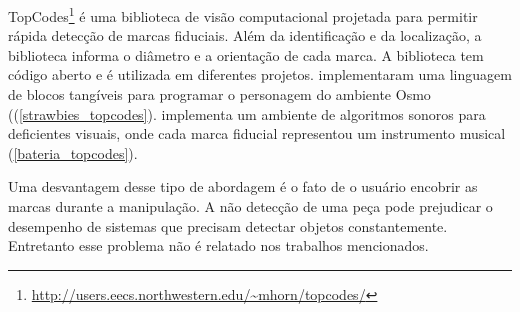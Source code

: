 TopCodes\footnote{\url{http://users.eecs.northwestern.edu/~mhorn/topcodes/}} é uma biblioteca de visão computacional projetada para permitir rápida detecção de marcas fiduciais. Além da identificação e da localização, a biblioteca informa o diâmetro e a orientação de cada marca. A biblioteca tem código aberto e é utilizada em diferentes projetos.  implementaram uma linguagem de blocos tangíveis para programar o personagem do ambiente Osmo ((\autoref{strawbies_topcodes}).  implementa um ambiente de algoritmos sonoros para deficientes visuais, onde cada marca fiducial representou um instrumento musical (\autoref{bateria_topcodes}).

Uma desvantagem desse tipo de abordagem é o fato de o usuário encobrir as marcas durante a manipulação. A não detecção de uma peça pode prejudicar o desempenho de sistemas que precisam detectar objetos constantemente. Entretanto esse problema não é relatado nos trabalhos mencionados.

